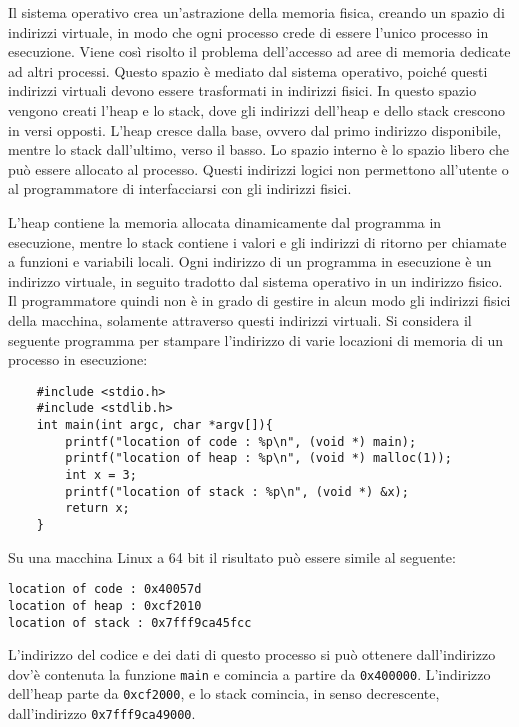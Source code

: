 \documentclass{article}
\numberwithin{equation}{subsection}
\begin{document}

Il sistema operativo crea un'astrazione della 
memoria fisica, creando un spazio di indirizzi virtuale, in modo che ogni processo crede di essere l'unico processo in esecuzione. Viene così risolto il problema 
dell'accesso ad aree di memoria dedicate ad altri processi. 
Questo spazio è mediato dal sistema operativo, poiché questi indirizzi virtuali devono essere trasformati in indirizzi fisici. 
In questo spazio vengono creati l'heap e lo stack, dove gli indirizzi dell'heap e dello stack crescono in versi opposti. L'heap cresce dalla base, ovvero dal primo 
indirizzo disponibile, mentre lo stack dall'ultimo, verso il basso. Lo spazio interno è lo spazio libero che può essere allocato al processo. 
Questi indirizzi logici non permettono all'utente o al programmatore di interfacciarsi con gli indirizzi fisici. 


L'heap contiene la memoria allocata dinamicamente dal programma in esecuzione, mentre lo stack contiene i valori e gli indirizzi di ritorno per chiamate a funzioni e 
variabili locali. 
Ogni indirizzo di un programma in esecuzione è un indirizzo virtuale, in seguito tradotto dal sistema operativo in un indirizzo fisico. Il programmatore quindi non è in 
grado di gestire in alcun modo gli indirizzi fisici della macchina, solamente attraverso questi indirizzi virtuali. Si considera il seguente programma per 
stampare l'indirizzo di varie locazioni di memoria di un processo in esecuzione:
\begin{verbatim}
    #include <stdio.h>
    #include <stdlib.h>
    int main(int argc, char *argv[]){
        printf("location of code : %p\n", (void *) main);
        printf("location of heap : %p\n", (void *) malloc(1));
        int x = 3;
        printf("location of stack : %p\n", (void *) &x);
        return x;
    }
\end{verbatim}

Su una macchina Linux a 64 bit il risultato può essere simile al seguente:
\begin{verbatim}
location of code : 0x40057d
location of heap : 0xcf2010
location of stack : 0x7fff9ca45fcc    
\end{verbatim}

L'indirizzo del codice e dei dati di questo processo si può ottenere dall'indirizzo dov'è contenuta la funzione \verb|main| e comincia a partire da \verb|0x400000|. 
L'indirizzo dell'heap parte da \verb|0xcf2000|, e lo stack comincia, in senso decrescente, dall'indirizzo \verb|0x7fff9ca49000|. 
\end{document}
